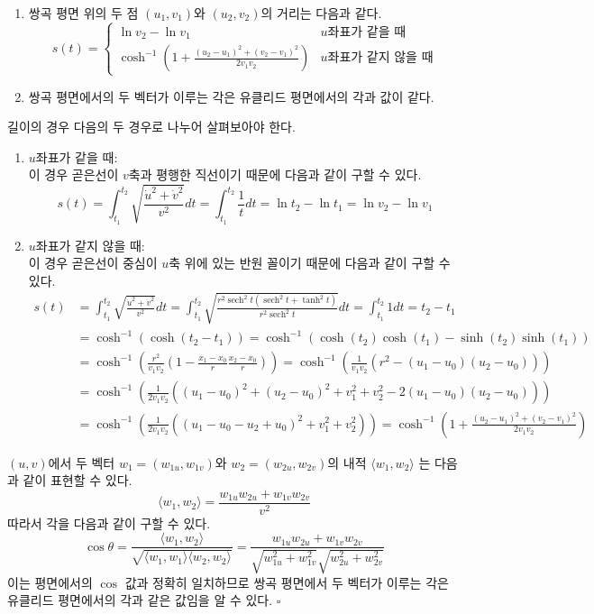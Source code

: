 \documentclass[10pt,a4paper]{article}
\DeclareMathOperator{\sech}{sech}
\renewenvironment{proof}{{\sffamily\bfseries Proof:~}}{\hfill$\square$}
\begin{document}
\begin{tcolorbox}[title=쌍곡 평면 위의 거리와 각도]
\begin{enumerate}
\item 쌍곡 평면 위의 두 점 $(u_1,v_1)$와 $(u_2,v_2)$의 거리는 다음과 같다.\[
s(t)=\begin{cases}
\ln{v_2}-\ln{v_1} & \text{$u$좌표가 같을 때}\\
\cosh^{-1}\left(1+\displaystyle\frac{(u_2-u_1)^2+(v_2-v_1)^2}{2v_1v_2}\right) & \text{$u$좌표가 같지 않을 때} 
\end{cases}
\]
\item 쌍곡 평면에서의 두 벡터가 이루는 각은 유클리드 평면에서의 각과 값이 같다.
\end{enumerate}
\end{tcolorbox}
\begin{proof}
길이의 경우 다음의 두 경우로 나누어 살펴보아야 한다.
\begin{enumerate}
\item $u$좌표가 같을 때:\\
이 경우 곧은선이 $v$축과 평행한 직선이기 때문에 다음과 같이 구할 수 있다.\[
s(t)=\int_{t_1}^{t_2}\sqrt{\frac{\dot{u}^2+\dot{v}^2}{v^2}}dt=\int_{t_1}^{t_2}\frac{1}{t}dt=\ln{t_2}-\ln{t_1}=\ln{v_2}-\ln{v_1}
\]
\item $u$좌표가 같지 않을 때:\\
이 경우 곧은선이 중심이 $u$축 위에 있는 반원 꼴이기 때문에 다음과 같이 구할 수 있다.
\begin{align*}
\!\!\!\!\!\!\!\!\!\!\!\!\!\!%
s(t)&=\int_{t_1}^{t_2}\sqrt{\frac{\dot{u}^2+\dot{v}^2}{v^2}}dt
=\int_{t_1}^{t_2}\sqrt{\frac{r^2\sech^2{t}(\sech^2{t}+\tanh^2{t})}{r^2\sech^2{t}}}dt=\int_{t_1}^{t_2}1dt
=t_2-t_1\\
&=\cosh^{-1}(\cosh(t_2-t_1)) = \cosh^{-1}(\cosh(t_2)\cosh(t_1)-\sinh(t_2)\sinh(t_1))\\
&=\cosh^{-1}\left(\frac{r^2}{v_1v_2}\left(1-\frac{x_1-x_0}{r}\frac{x_2-x_0}{r}\right)\right)
=\cosh^{-1}\left(\frac{1}{v_1v_2}(r^2-(u_1-u_0)(u_2-u_0))\right)\\
&=\cosh^{-1}\left(\frac{1}{2v_1v_2}((u_1-u_0)^2+(u_2-u_0)^2+v_1^2+v_2^2-2(u_1-u_0)(u_2-u_0))\right)\\
&=\cosh^{-1}\left(\frac{1}{2v_1v_2}((u_1-u_0-u_2+u_0)^2+v_1^2+v_2^2)\right)=\cosh^{-1}\left(1+\displaystyle\frac{(u_2-u_1)^2+(v_2-v_1)^2}{2v_1v_2}\right)
\end{align*}
\end{enumerate}
$(u,v)$에서 두 벡터 $w_1=(w_{1u},w_{1v})$와 $w_2=(w_{2u},w_{2v})$의 내적 $\langle w_1,w_2\rangle$ 는 다음과 같이 표현할 수 있다.\[
\langle w_1,w_2\rangle=\frac{w_{1u}w_{2u}+w_{1v}w_{2v}}{v^2}
\]
따라서 각을 다음과 같이 구할 수 있다.\[
\cos\theta=\frac{\langle w_1,w_2\rangle}{\sqrt{\langle w_1,w_1\rangle\langle w_2,w_2\rangle}}=\frac{w_{1u}w_{2u}+w_{1v}w_{2v}}{\sqrt{w_{1u}^2+w_{1v}^2}\sqrt{w_{2u}^2+w_{2v}^2}}
\]
이는 평면에서의 $\cos$ 값과 정확히 일치하므로 쌍곡 평면에서 두 벡터가 이루는 각은 유클리드 평면에서의 각과 같은 값임을 알 수 있다.
\end{proof}
\end{document}
